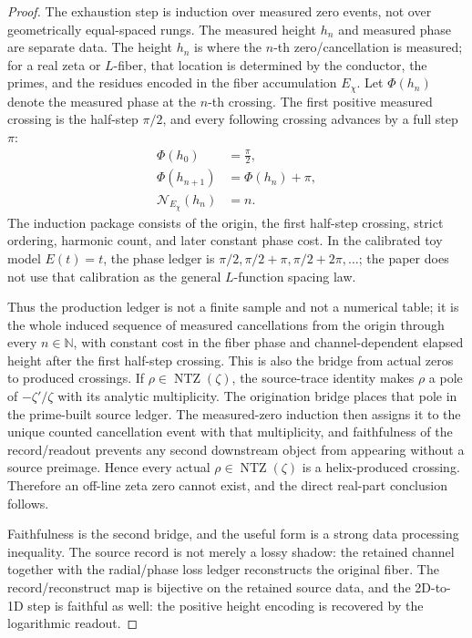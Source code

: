 \documentclass[11pt]{article}
\DeclareMathOperator{\NTZ}{NTZ}
\begin{document}
\begin{proof}
The exhaustion step is induction over measured zero events, not over
geometrically equal-spaced rungs.  The measured height $h_n$ and measured
phase are separate data.  The height $h_n$ is where the $n$-th
zero/cancellation is measured; for a real zeta or $L$-fiber, that location is
determined by the conductor, the primes, and the residues encoded in the fiber
accumulation $E_\chi$.  Let $\Phi(h_n)$ denote the measured phase at the $n$-th
crossing.  The first positive measured crossing is the half-step $\pi/2$, and
every following crossing advances by a full step $\pi$:
\[
  \begin{aligned}
  \Phi(h_0)&=\frac{\pi}{2},\\
  \Phi(h_{n+1})&=\Phi(h_n)+\pi,\\
  \mathcal N_{E_\chi}(h_n)&=n .
  \end{aligned}
\]
The induction package consists of the origin, the first half-step crossing,
strict ordering, harmonic count, and later constant phase cost.  In the
calibrated toy model $E(t)=t$, the
phase ledger is $\pi/2,\pi/2+\pi,\pi/2+2\pi,\ldots$; the paper does not use
that calibration as the general $L$-function spacing law.

Thus the production ledger is not a finite sample and not a numerical table; it
is the whole induced sequence of measured cancellations from the origin through
every $n\in\mathbb N$, with constant cost in the fiber phase and channel-dependent
elapsed height after the first half-step crossing.  This is also the bridge from
actual zeros to produced crossings.  If $\rho\in\NTZ(\zeta)$, the source-trace identity makes $\rho$ a
pole of $-\zeta'/\zeta$ with its analytic multiplicity.  The origination bridge places
that pole in the prime-built source ledger.  The measured-zero induction then
assigns it to the unique counted cancellation event with that multiplicity, and
faithfulness of the record/readout prevents any second downstream object from
appearing without a source preimage.  Hence every actual $\rho\in\NTZ(\zeta)$
is a helix-produced crossing.  Therefore an off-line zeta zero cannot exist,
and the direct real-part conclusion follows.

Faithfulness is the second bridge, and the useful form is a strong data
processing inequality.  The source record is not
merely a lossy shadow: the retained channel together with the radial/phase loss
ledger reconstructs the original fiber.  The record/reconstruct map is
bijective on the retained source data, and the 2D-to-1D step is faithful as
well: the positive height encoding is recovered by the logarithmic readout.


\end{proof}
\end{document}
